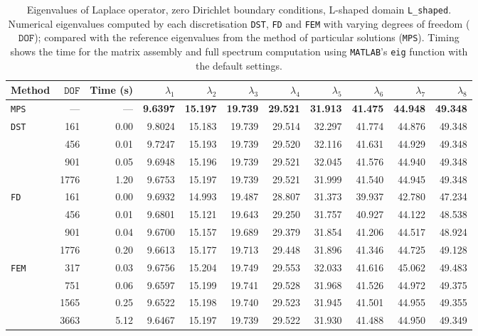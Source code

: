 %

\begin{table}[htbp]
  \centering
  {\scriptsize
  \begin{tabular}{lrrrrrrrrrr}
    \toprule
    Method & $\mathtt{DOF}$ & Time (s) & $\lambda_{1}$ & $\lambda_{2}$ & $\lambda_{3}$ & $\lambda_{4}$ & $\lambda_{5}$ & $\lambda_{6}$ & $\lambda_{7}$ & $\lambda_{8}$ \\
    \midrule
    \texttt{MPS} & --- & --- & \textbf{9.6397} & \textbf{15.197} & \textbf{19.739} & \textbf{29.521} & \textbf{31.913} & \textbf{41.475} & \textbf{44.948} & \textbf{49.348} \\
    \midrule
    \multirow{4}{*}{\texttt{DST}} & 161 & 0.00 & 9.8024 & 15.183 & 19.739 & 29.514 & 32.297 & 41.774 & 44.876 & 49.348 \\
     & 456 & 0.01 & 9.7247 & 15.193 & 19.739 & 29.520 & 32.116 & 41.631 & 44.929 & 49.348 \\
     & 901 & 0.05 & 9.6948 & 15.196 & 19.739 & 29.521 & 32.045 & 41.576 & 44.940 & 49.348 \\
     & 1776 & 1.20 & 9.6753 & 15.197 & 19.739 & 29.521 & 31.999 & 41.540 & 44.945 & 49.348 \\
    \midrule
    \multirow{4}{*}{\texttt{FD}} & 161 & 0.00 & 9.6932 & 14.993 & 19.487 & 28.807 & 31.373 & 39.937 & 42.780 & 47.234 \\
     & 456 & 0.01 & 9.6801 & 15.121 & 19.643 & 29.250 & 31.757 & 40.927 & 44.122 & 48.538 \\
     & 901 & 0.04 & 9.6700 & 15.157 & 19.689 & 29.379 & 31.854 & 41.206 & 44.517 & 48.924 \\
     & 1776 & 0.20 & 9.6613 & 15.177 & 19.713 & 29.448 & 31.896 & 41.346 & 44.725 & 49.128 \\
    \midrule
    \multirow{4}{*}{\texttt{FEM}} & 317 & 0.03 & 9.6756 & 15.204 & 19.749 & 29.553 & 32.033 & 41.616 & 45.062 & 49.483 \\
     & 751 & 0.06 & 9.6597 & 15.199 & 19.741 & 29.528 & 31.968 & 41.526 & 44.972 & 49.375 \\
     & 1565 & 0.25 & 9.6522 & 15.198 & 19.740 & 29.523 & 31.945 & 41.501 & 44.955 & 49.355 \\
     & 3663 & 5.12 & 9.6467 & 15.197 & 19.739 & 29.522 & 31.930 & 41.488 & 44.950 & 49.349 \\
    \bottomrule
  \end{tabular}}
  \caption{Eigenvalues of Laplace operator, zero Dirichlet boundary conditions, L-shaped domain \texttt{L\_shaped}. Numerical eigenvalues computed by each discretisation \texttt{DST}, \texttt{FD} and \texttt{FEM} with varying degrees of freedom ($\mathtt{DOF}$); compared with the reference eigenvalues from the method of particular solutions (\texttt{MPS}). Timing shows the time for the matrix assembly and full spectrum computation using \texttt{MATLAB}'s \lstinline{eig} function with the default settings.}
  \label{tab:eigenvalues_head_L_shaped}
\end{table}
